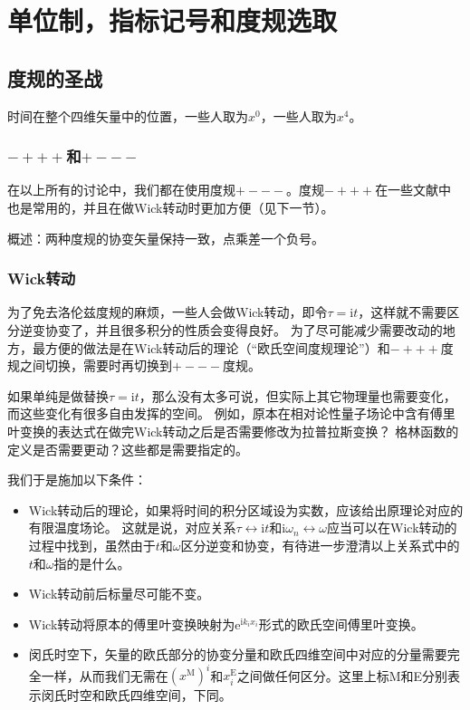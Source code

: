 \documentclass[hyperref, UTF8, a4paper]{ctexart}
\newcommand*{\ii}{\mathrm{i}}
\newcommand*{\ee}{\mathrm{e}}
\begin{document}
\section{单位制，指标记号和度规选取}

\subsection{度规的圣战}

时间在整个四维矢量中的位置，一些人取为$x^0$，一些人取为$x^4$。

\subsubsection{$-+++$和$+---$}

在以上所有的讨论中，我们都在使用度规$+---$。度规$-+++$在一些文献中也是常用的，并且在做Wick转动时更加方便（见下一节）。

概述：两种度规的协变矢量保持一致，点乘差一个负号。

\subsubsection{Wick转动}

为了免去洛伦兹度规的麻烦，一些人会做Wick转动，即令$\tau=\ii t$，这样就不需要区分逆变协变了，并且很多积分的性质会变得良好。
为了尽可能减少需要改动的地方，最方便的做法是在Wick转动后的理论（“欧氏空间度规理论”）和$-+++$度规之间切换，需要时再切换到$+---$度规。

如果单纯是做替换$\tau = \ii t$，那么没有太多可说，但实际上其它物理量也需要变化，而这些变化有很多自由发挥的空间。
例如，原本在相对论性量子场论中含有傅里叶变换的表达式在做完Wick转动之后是否需要修改为拉普拉斯变换？
格林函数的定义是否需要更动？这些都是需要指定的。

我们于是施加以下条件：
\begin{itemize}
    \item Wick转动后的理论，如果将时间的积分区域设为实数，应该给出原理论对应的有限温度场论。
    这就是说，对应关系$\tau \leftrightarrow \ii t$和$\ii \omega_n \leftrightarrow \omega$应当可以在Wick转动的过程中找到，虽然由于$t$和$\omega$区分逆变和协变，有待进一步澄清以上关系式中的$t$和$\omega$指的是什么。
    \item Wick转动前后标量尽可能不变。
    \item Wick转动将原本的傅里叶变换映射为$\ee^{\ii k_i x_i}$形式的欧氏空间傅里叶变换。
    \item 闵氏时空下，矢量的欧氏部分的协变分量和欧氏四维空间中对应的分量需要完全一样，从而我们无需在$(x^\text{M})^i$和$x^\text{E}_i$之间做任何区分。这里上标M和E分别表示闵氏时空和欧氏四维空间，下同。
\end{itemize}
\end{document}
